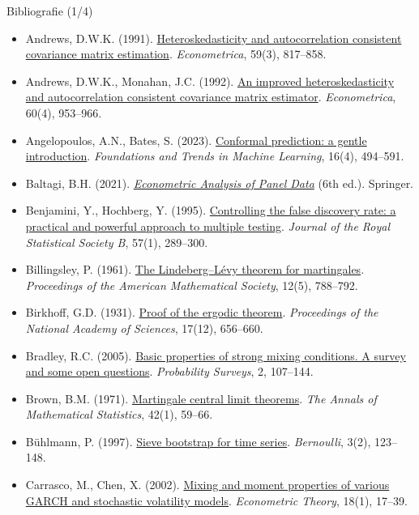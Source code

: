 \begin{frame}{Bibliografie (1/4)}
\itemsize{\tiny}
\begin{itemize}
    \item Andrews, D.W.K. (1991). \href{https://doi.org/10.2307/2938229}{Heteroskedasticity and autocorrelation consistent covariance matrix estimation}. \emph{Econometrica}, 59(3), 817--858.
    \item Andrews, D.W.K., Monahan, J.C. (1992). \href{https://doi.org/10.2307/2951574}{An improved heteroskedasticity and autocorrelation consistent covariance matrix estimator}. \emph{Econometrica}, 60(4), 953--966.
    \item Angelopoulos, A.N., Bates, S. (2023). \href{https://doi.org/10.1561/2200000101}{Conformal prediction: a gentle introduction}. \emph{Foundations and Trends in Machine Learning}, 16(4), 494--591.
    \item Baltagi, B.H. (2021). \href{https://doi.org/10.1007/978-3-030-53953-5}{\emph{Econometric Analysis of Panel Data}} (6th ed.). Springer.
    \item Benjamini, Y., Hochberg, Y. (1995). \href{https://doi.org/10.1111/j.2517-6161.1995.tb02031.x}{Controlling the false discovery rate: a practical and powerful approach to multiple testing}. \emph{Journal of the Royal Statistical Society B}, 57(1), 289--300.
    \item Billingsley, P. (1961). \href{https://doi.org/10.1090/S0002-9939-1961-0126871-X}{The Lindeberg--Lévy theorem for martingales}. \emph{Proceedings of the American Mathematical Society}, 12(5), 788--792.
    \item Birkhoff, G.D. (1931). \href{https://doi.org/10.1073/pnas.17.2.656}{Proof of the ergodic theorem}. \emph{Proceedings of the National Academy of Sciences}, 17(12), 656--660.
    \item Bradley, R.C. (2005). \href{https://doi.org/10.1214/154957805100000104}{Basic properties of strong mixing conditions. A survey and some open questions}. \emph{Probability Surveys}, 2, 107--144.
    \item Brown, B.M. (1971). \href{https://doi.org/10.1214/aoms/1177693494}{Martingale central limit theorems}. \emph{The Annals of Mathematical Statistics}, 42(1), 59--66.
    \item Bühlmann, P. (1997). \href{https://doi.org/10.2307/3318584}{Sieve bootstrap for time series}. \emph{Bernoulli}, 3(2), 123--148.
    \item Carrasco, M., Chen, X. (2002). \href{https://doi.org/10.1017/S0266466602181023}{Mixing and moment properties of various GARCH and stochastic volatility models}. \emph{Econometric Theory}, 18(1), 17--39.

\end{itemize}
\end{frame}
